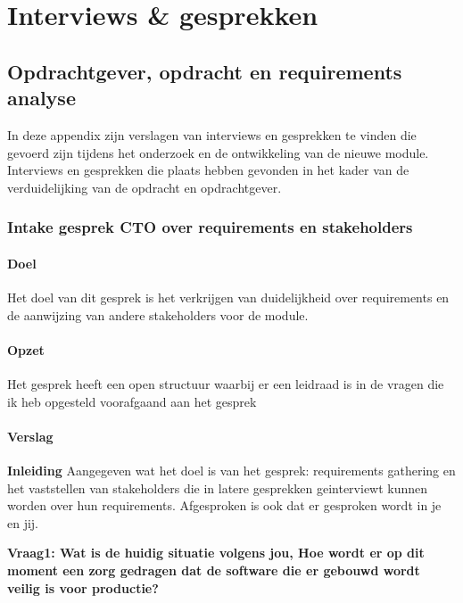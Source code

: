 
\chapter{Interviews \& gesprekken}\label{app:Interviews}


\section{Opdrachtgever, opdracht en requirements analyse}\label{int:opdrachtgever}
In deze appendix zijn verslagen van interviews en gesprekken te vinden die gevoerd zijn tijdens het onderzoek en de ontwikkeling van de nieuwe module.
Interviews en gesprekken die plaats hebben gevonden in het kader van de verduidelijking van de opdracht en opdrachtgever.
\subsection{Intake gesprek CTO over requirements en stakeholders}

\subsubsection{Doel}
Het doel van dit gesprek is het verkrijgen van duidelijkheid over requirements en de aanwijzing van andere stakeholders voor de module.

\subsubsection{Opzet}
Het gesprek heeft een open structuur waarbij er een leidraad is in de vragen die ik heb opgesteld voorafgaand aan het gesprek

\subsubsection{Verslag}
\textbf{Inleiding}
Aangegeven wat het doel is van het gesprek: requirements gathering en het vaststellen van stakeholders die in latere gesprekken geinterviewt kunnen worden over hun requirements. Afgesproken is ook dat er gesproken wordt in je en jij.

\bigskip

\textbf{Vraag1: Wat is de huidig situatie volgens jou, Hoe wordt er op dit moment een zorg gedragen dat de software die er gebouwd wordt veilig is voor productie?}

